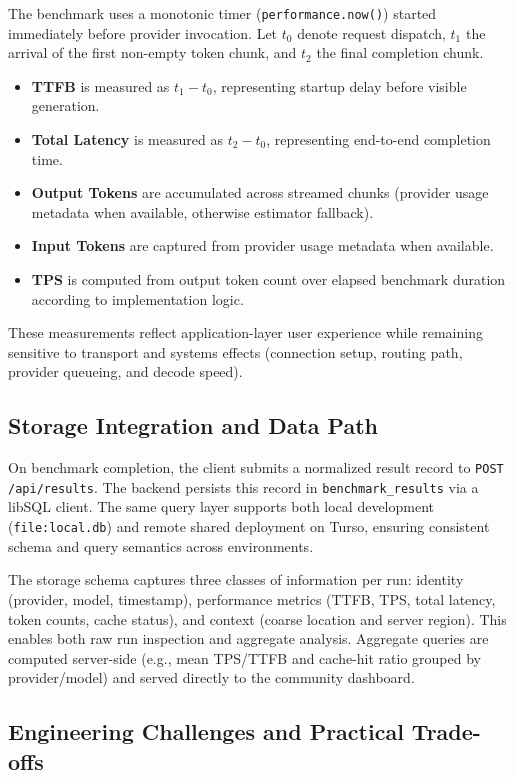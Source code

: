 \documentclass[11pt, a4paper]{article}
\begin{document}
The benchmark uses a monotonic timer (\texttt{performance.now()}) started immediately before provider invocation. Let $t_0$ denote request dispatch, $t_1$ the arrival of the first non-empty token chunk, and $t_2$ the final completion chunk.

\begin{itemize}
  \item \textbf{TTFB} is measured as $t_1 - t_0$, representing startup delay before visible generation.
  \item \textbf{Total Latency} is measured as $t_2 - t_0$, representing end-to-end completion time.
  \item \textbf{Output Tokens} are accumulated across streamed chunks (provider usage metadata when available, otherwise estimator fallback).
  \item \textbf{Input Tokens} are captured from provider usage metadata when available.
  \item \textbf{TPS} is computed from output token count over elapsed benchmark duration according to implementation logic.
\end{itemize}

These measurements reflect application-layer user experience while remaining sensitive to transport and systems effects (connection setup, routing path, provider queueing, and decode speed).

\subsection{Storage Integration and Data Path}

On benchmark completion, the client submits a normalized result record to \texttt{POST /api/results}. The backend persists this record in \texttt{benchmark\_results} via a libSQL client. The same query layer supports both local development (\texttt{file:local.db}) and remote shared deployment on Turso, ensuring consistent schema and query semantics across environments.

The storage schema captures three classes of information per run: identity (provider, model, timestamp), performance metrics (TTFB, TPS, total latency, token counts, cache status), and context (coarse location and server region). This enables both raw run inspection and aggregate analysis. Aggregate queries are computed server-side (e.g., mean TPS/TTFB and cache-hit ratio grouped by provider/model) and served directly to the community dashboard.

\subsection{Engineering Challenges and Practical Trade-offs}
\end{document}

